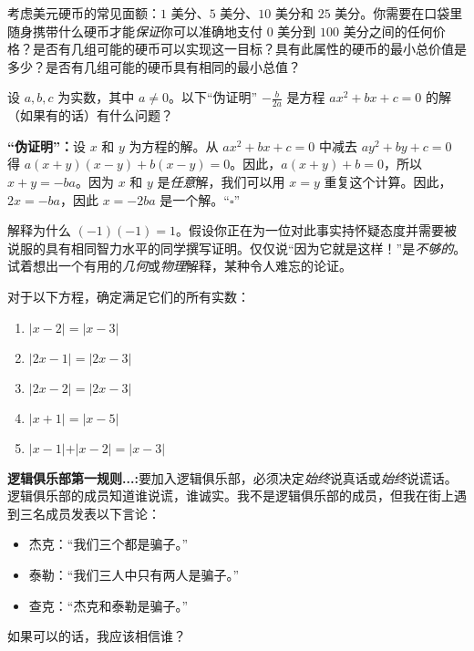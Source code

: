 \begin{exercise}
    考虑美元硬币的常见面额：$1$ 美分、$5$ 美分、$10$ 美分和 $25$ 美分。你需要在口袋里随身携带什么硬币才能\emph{保证}你可以准确地支付 $0$ 美分到 $100$ 美分之间的任何价格？是否有几组可能的硬币可以实现这一目标？具有此属性的硬币的最小总价值是多少？是否有几组可能的硬币具有相同的最小总值？
\end{exercise}

\begin{exercise}
    设 $a,b,c$ 为实数，其中 $a \ne 0$。以下``伪证明'' $-\frac{b}{2a}$ 是方程 $ax^2 + bx + c = 0$ 的解（如果有的话）有什么问题？

    \textbf{``伪证明''：}设 $x$ 和 $y$ 为方程的解。从 $ax^2+bx+c = 0$ 中减去 $ay^2+by+c = 0$ 得 $a(x+y)(x-y)+b(x-y) = 0$。因此，$a(x+y)+b = 0$，所以 $x + y = -ba$。因为 $x$ 和 $y$ 是\emph{任意}解，我们可以用 $x = y$ 重复这个计算。因此，$2x = -ba$，因此 $x = -2ba$ 是一个解。``$\square$''
\end{exercise}

\begin{exercise}
    解释为什么 $(-1)(-1) = 1$。假设你正在为一位对此事实持怀疑态度并需要被说服的具有相同智力水平的同学撰写证明。仅仅说``因为它就是这样！''是\emph{不够的}。试着想出一个有用的\emph{几何}或\emph{物理}解释，某种令人难忘的论证。
\end{exercise}

\begin{exercise}
    对于以下方程，确定满足它们的所有实数：

    \begin{enumerate}
        \item $\vert x-2 \vert = \vert x-3\vert$
        \item $\vert 2x-1 \vert = \vert 2x-3\vert$
        \item $\vert 2x-2 \vert = \vert 2x-3\vert$
        \item $\vert x+1 \vert = \vert x-5\vert$
        \item $\vert x-1 \vert + \vert x-2 \vert = \vert x-3\vert$
    \end{enumerate}
\end{exercise}

\begin{exercise}
    \textbf{逻辑俱乐部第一规则...:}要加入逻辑俱乐部，必须决定\emph{始终}说真话或\emph{始终}说谎话。逻辑俱乐部的成员知道谁说谎，谁诚实。我不是逻辑俱乐部的成员，但我在街上遇到三名成员发表以下言论：

    \begin{itemize}
        \item 杰克：``我们三个都是骗子。''
        \item 泰勒：``我们三人中只有两人是骗子。'' 
        \item 查克：``杰克和泰勒是骗子。''
    \end{itemize}

    如果可以的话，我应该相信谁？
\end{exercise}

